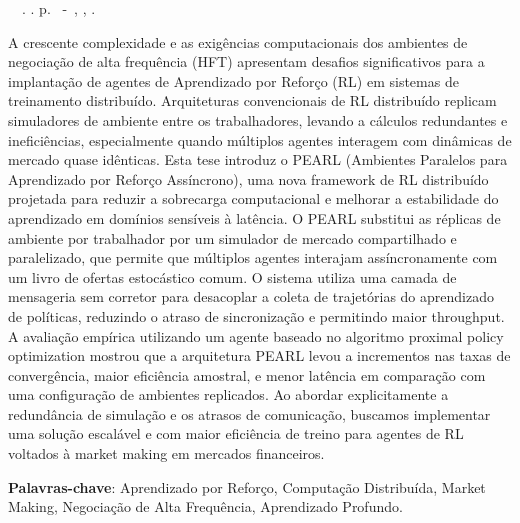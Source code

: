 \setlength{\absparsep}{18pt} %
\begin{resumo}
	\begin{flushleft} 
			\setlength{\absparsep}{0pt} %
			\SingleSpacing 
			\imprimirautorabr~~\textbf{\imprimirtituloresumo}.	\imprimirdata. \pageref{LastPage} p. 
			\imprimirtipotrabalho~-~\imprimirinstituicao, \imprimirlocal, \imprimirdata. 
 	\end{flushleft}
\OnehalfSpacing 			
    A crescente complexidade e as exigências computacionais dos ambientes de negociação de alta frequência (HFT) apresentam desafios significativos para
    a implantação de agentes de Aprendizado por Reforço (RL) em sistemas de treinamento distribuído.
    Arquiteturas convencionais de RL distribuído replicam simuladores de ambiente entre os trabalhadores,
    levando a cálculos redundantes e ineficiências, especialmente quando múltiplos agentes interagem com dinâmicas de mercado quase idênticas.
    Esta tese introduz o PEARL (Ambientes Paralelos para Aprendizado por Reforço Assíncrono),
    uma nova framework de RL distribuído projetada para reduzir a sobrecarga computacional e melhorar a estabilidade do aprendizado em domínios sensíveis à latência.
    O PEARL substitui as réplicas de ambiente por trabalhador por um simulador de mercado compartilhado e paralelizado, que permite
    que múltiplos agentes interajam assíncronamente com um livro de ofertas estocástico comum.
    O sistema utiliza uma camada de mensageria sem corretor para desacoplar a coleta de trajetórias do aprendizado de políticas,
    reduzindo o atraso de sincronização e permitindo maior throughput.
    A avaliação empírica utilizando um agente baseado no algoritmo proximal policy optimization mostrou que a arquitetura PEARL
    levou a incrementos nas taxas de convergência, maior eficiência amostral,
    e menor latência em comparação com uma configuração de ambientes replicados.
    Ao abordar explicitamente a redundância de simulação e os atrasos de comunicação,
    buscamos implementar uma solução escalável e com maior eficiência de treino para agentes de RL voltados à market making em mercados financeiros.

 \textbf{Palavras-chave}: Aprendizado por Reforço, Computação Distribuída, Market Making, Negociação de Alta Frequência, Aprendizado Profundo.
\end{resumo}
